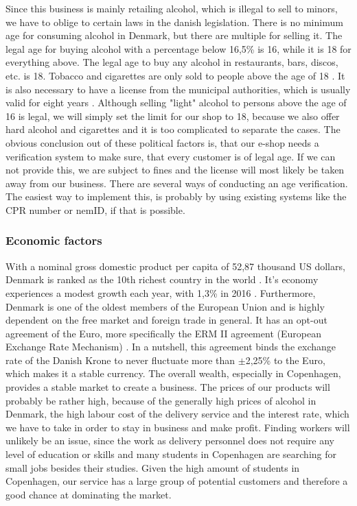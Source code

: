\documentclass[12p]{article}
\begin{document}
Since this business is mainly retailing alcohol, which is illegal to sell to minors, we have to oblige to certain laws in the danish legislation. There is no minimum age for consuming alcohol in Denmark, but there are multiple for selling it. The legal age for buying alcohol with a percentage below 16,5\% is 16, while it is 18 for everything above. The legal age to buy any alcohol in restaurants, bars, discos, etc. is 18. Tobacco and cigarettes are only sold to people above the age of 18 \cite{PEST_AlcoholAndTobaccoLegalAge}. It is also necessary to have a license from the municipal authorities, which is usually valid for eight years \cite{PEST_DenmarkAlcoholLaws}. Although selling "light" alcohol to persons above the age of 16 is legal, we will simply set the limit for our shop to 18, because we also offer hard alcohol and cigarettes and it is too complicated to separate the cases. The obvious conclusion out of these political factors is, that our e-shop needs a verification system to make sure, that every customer is of legal age. If we can not provide this, we are subject to fines and the license will most likely be taken away from our business. There are several ways of conducting an age verification. The easiest way to implement this, is probably by using existing systems like the CPR number or nemID, if that is possible.

\subsubsection{Economic factors}

With a nominal gross domestic product per capita of 52,87 thousand US dollars, Denmark is ranked as the 10th richest country in the world \cite{PEST_NominalGDPPerCapita}. It's economy experiences a modest growth each year, with 1,3\% in 2016 \cite{PEST_CIAFactbookDenmark}. Furthermore, Denmark is one of the oldest members of the European Union and is highly dependent on the free market and foreign trade in general. It has an opt-out agreement of the Euro, more specifically the ERM II agreement (European Exchange Rate Mechanism) \cite{PEST_ERM2}. In a nutshell, this agreement binds the exchange rate of the Danish Krone to never fluctuate more than $\pm$2,25\% to the Euro, which makes it a stable currency. The overall wealth, especially in Copenhagen, provides a stable market to create a business. The prices of our products will probably be rather high, because of the generally high prices of alcohol in Denmark, the high labour cost of the delivery service and the interest rate, which we have to take in order to stay in business and make profit. Finding workers will unlikely be an issue, since the work as delivery personnel does not require any level of education or skills and many students in Copenhagen are searching for small jobs besides their studies. Given the high amount of students in Copenhagen, our service has a large group of potential customers and therefore a good chance at dominating the market.
\end{document}
